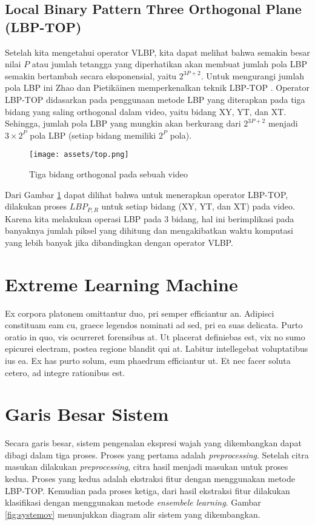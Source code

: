 \documentclass[review,3p,12pt]{elsarticle}
\begin{document}
\subsection{Local Binary Pattern Three Orthogonal Plane (LBP-TOP)}
\label{lbptop}

Setelah kita mengetahui operator VLBP, kita dapat melihat bahwa semakin besar nilai $P$ atau jumlah tetangga yang diperhatikan akan membuat jumlah pola LBP semakin bertambah secara eksponensial, yaitu $2^{3P+2}$. Untuk mengurangi jumlah pola LBP ini Zhao dan Pietik\"{a}inen memperkenalkan teknik LBP-TOP \cite{zhao2007dynamic2}. Operator LBP-TOP didasarkan pada penggunaan metode LBP yang diterapkan pada tiga bidang yang saling orthogonal dalam video, yaitu bidang XY, YT, dan XT. Sehingga, jumlah pola LBP yang mungkin akan berkurang dari $2^{3P+2}$ menjadi $3 \times 2^P$ pola LBP (setiap bidang memiliki $2^P$ pola).
\begin{figure}[hbt!]
\caption{Tiga bidang orthogonal pada sebuah video \cite{zhao2007dynamic2}}
\label{fig:top}
\centering
	\texttt{[image: assets/top.png]}
\end{figure}

Dari Gambar \ref{fig:top} dapat dilihat bahwa untuk menerapkan operator LBP-TOP, dilakukan proses $LBP_{P,R}$ untuk setiap bidang (XY, YT, dan XT) pada video. Karena kita melakukan operasi LBP pada 3 bidang, hal ini berimplikasi pada banyaknya jumlah piksel yang dihitung dan mengakibatkan waktu komputasi yang lebih banyak jika dibandingkan dengan operator VLBP.


\section{Extreme Learning Machine}
Ex corpora platonem omittantur duo, pri semper efficiantur an. Adipisci constituam eam cu, graece legendos nominati ad sed, pri ea suas delicata. Purto oratio in quo, vis ocurreret forensibus at. Ut placerat definiebas est, vix no sumo epicurei electram, postea regione blandit qui at. Labitur intellegebat voluptatibus ius ea. Ex has purto solum, eum phaedrum efficiantur ut. Et nec facer soluta cetero, ad integre rationibus est.


\section{Garis Besar Sistem}
\label{bigsystem}

Secara garis besar, sistem pengenalan ekspresi wajah yang dikembangkan dapat dibagi dalam tiga proses. Proses yang pertama adalah \textit{preprocessing}. Setelah citra masukan dilakukan \textit{preprocessing}, citra hasil menjadi masukan untuk proses kedua. Proses yang kedua adalah ekstraksi fitur dengan menggunakan metode LBP-TOP. Kemudian pada proses ketiga, dari hasil ekstraksi fitur dilakukan klasifikasi dengan menggunakan metode \textit{ensembele learning}. Gambar \ref{fig:systemov} menunjukkan diagram alir sistem yang dikembangkan.
\end{document}

